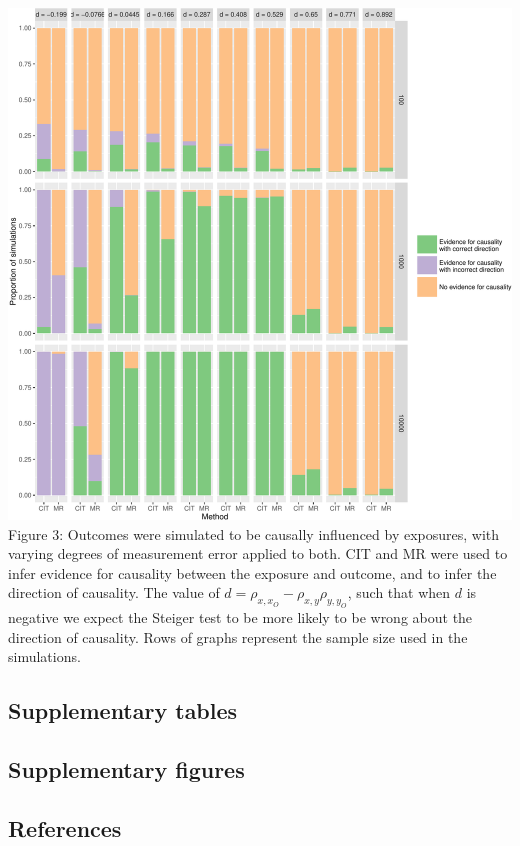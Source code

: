 \documentclass[]{article}
\begin{document}
\newpage

\includegraphics{manuscript_files/figure-latex/cit_mr_comparison_figure-1.pdf}\\
Figure 3: Outcomes were simulated to be causally influenced by
exposures, with varying degrees of measurement error applied to both.
CIT and MR were used to infer evidence for causality between the
exposure and outcome, and to infer the direction of causality. The value
of \(d = \rho_{x, x_O} - \rho_{x,y}\rho_{y,y_O}\), such that when \(d\)
is negative we expect the Steiger test to be more likely to be wrong
about the direction of causality. Rows of graphs represent the sample
size used in the simulations.

\newpage

\subsection{Supplementary tables}\label{supplementary-tables}

\newpage

\subsection{Supplementary figures}\label{supplementary-figures}

\subsection*{References}\label{references}
\end{document}
